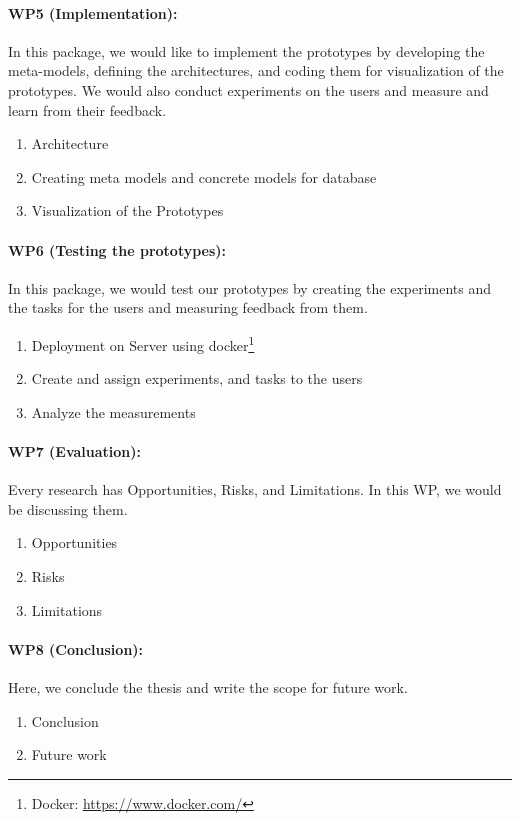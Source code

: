 \paragraph{WP5 (Implementation):} In this package, we would like to implement the prototypes by developing the meta-models, defining the architectures, and coding them for visualization of the prototypes.
We would also conduct experiments on the users and measure and learn from their feedback.
\begin{enumerate}
    \item Architecture
    \item Creating meta models and concrete models for database 
    \item Visualization of the Prototypes 
\end{enumerate}

\paragraph{WP6 (Testing the prototypes):} In this package, we would test our prototypes by creating the experiments and the tasks for the users and measuring feedback from them.
\begin{enumerate}
    \item Deployment on Server using docker\footnote{Docker: \url{https://www.docker.com/}}
    \item Create and assign experiments, and tasks to the users 
    \item Analyze the measurements
\end{enumerate}

\paragraph{WP7 (Evaluation):} Every research has Opportunities, Risks, and Limitations. In this WP, we would be discussing them.
\begin{enumerate}
    \item Opportunities
    \item Risks
    \item Limitations
\end{enumerate}

\paragraph{WP8 (Conclusion):} Here, we conclude the thesis and write the scope for future work.
\begin{enumerate}
    \item Conclusion
    \item Future work
\end{enumerate}

